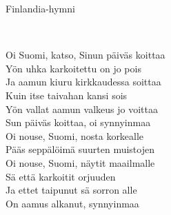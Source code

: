 \begin{song}{Finlandia-hymni}
	
	
	\\

	Oi Suomi, katso, Sinun päiväs koittaa\\
	Yön uhka karkoitettu on jo pois\\
	Ja aamun kiuru kirkkaudessa soittaa\\
	Kuin itse taivahan kansi sois\\
	Yön vallat aamun valkeus jo voittaa\\
	Sun päiväs koittaa, oi synnyinmaa\\

	Oi nouse, Suomi, nosta korkealle\\
	Pääs seppälöimä suurten muistojen\\
	Oi nouse, Suomi, näytit maailmalle\\
	Sä että karkoitit orjuuden\\
	Ja ettet taipunut sä sorron alle\\
	On aamus alkanut, synnyinmaa\\
	
	
	
\end{song}
